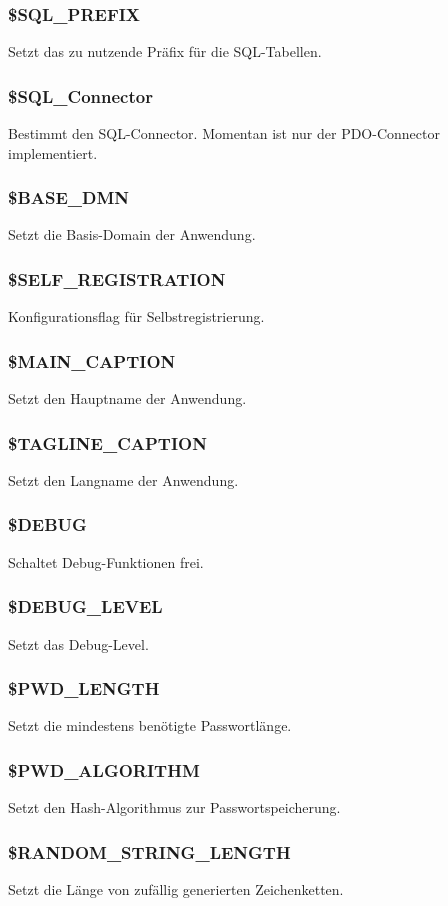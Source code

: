 \subsubsection{\$SQL\_PREFIX} Setzt das zu nutzende Präfix für die SQL-Tabellen.
\subsubsection{\$SQL\_Connector} Bestimmt den SQL-Connector. Momentan ist nur der PDO-Connector implementiert.
\subsubsection{\$BASE\_DMN} Setzt die Basis-Domain der Anwendung.
\subsubsection{\$SELF\_REGISTRATION} Konfigurationsflag für Selbstregistrierung.
\subsubsection{\$MAIN\_CAPTION} Setzt den Hauptname der Anwendung.
\subsubsection{\$TAGLINE\_CAPTION} Setzt den Langname der Anwendung.
\subsubsection{\$DEBUG} Schaltet Debug-Funktionen frei.
\subsubsection{\$DEBUG\_LEVEL} Setzt das Debug-Level.
\subsubsection{\$PWD\_LENGTH} Setzt die mindestens benötigte Passwortlänge.
\subsubsection{\$PWD\_ALGORITHM} Setzt den Hash-Algorithmus zur Passwortspeicherung.
\subsubsection{\$RANDOM\_STRING\_LENGTH} Setzt die Länge von zufällig generierten Zeichenketten.
